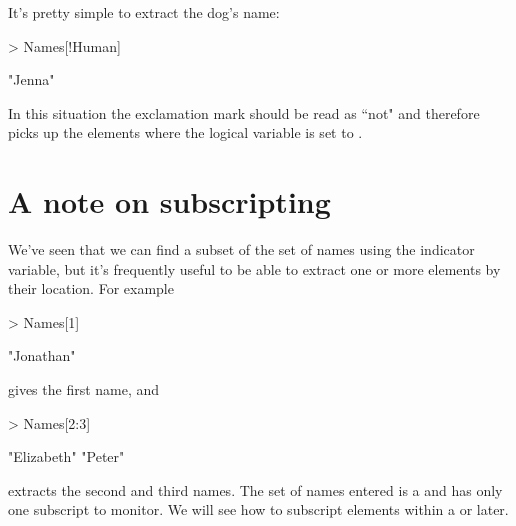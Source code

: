 It's pretty simple to extract the dog's name: 
\begin{Schunk}
\begin{Sinput}
> Names[!Human] 
\end{Sinput}
\begin{Soutput}
[1] "Jenna"
\end{Soutput}
\end{Schunk}
In this situation the exclamation mark should be read as ``not" and therefore picks up the elements where the logical variable is set to . 
 
\section{A note on subscripting} 
 
We've seen that we can find a subset of the set of names using the indicator variable, but it's frequently useful to be able to extract one or more elements by their location. For example 
\begin{Schunk}
\begin{Sinput}
> Names[1] 
\end{Sinput}
\begin{Soutput}
[1] "Jonathan"
\end{Soutput}
\end{Schunk}
gives the first name, and  
\begin{Schunk}
\begin{Sinput}
> Names[2:3] 
\end{Sinput}
\begin{Soutput}
[1] "Elizabeth" "Peter"    
\end{Soutput}
\end{Schunk}
extracts the second and third names. The set of names entered is a  and has only one subscript to monitor. We will see how to subscript elements within a  or  later. 
 
